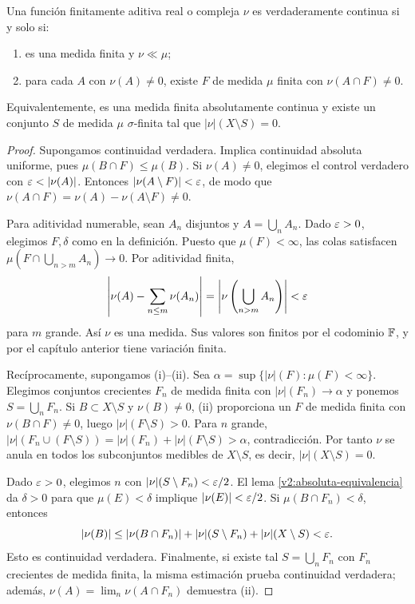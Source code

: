 \begin{proposicion}\label{v2:verdadera-caracterizacion}
Una función finitamente aditiva real o compleja $\nu$ es verdaderamente continua si y solo si:
\begin{enumerate}
\item es una medida finita y $\nu\ll\mu$;
\item para cada $A$ con $\nu(A)\ne0$, existe $F$ de medida $\mu$ finita con $\nu(A\cap F)\ne0$.
\end{enumerate}
Equivalentemente, es una medida finita absolutamente continua y existe un conjunto $S$ de medida $\mu$ $\sigma$-finita tal que $|\nu|(X\setminus S)=0$.
\end{proposicion}
\begin{proof}
Supongamos continuidad verdadera. Implica continuidad absoluta uniforme, pues $\mu(B\cap F)\le\mu(B)$. Si $\nu(A)\ne0$, elegimos el control verdadero con $\eps<|\nu(A)|$. Entonces $|\nu(A\setminus F)|<\varepsilon$, de modo que $\nu(A\cap F)=\nu(A)-\nu(A\setminus F)\ne0$.

Para aditividad numerable, sean $A_n$ disjuntos y $A=\bigcup_nA_n$. Dado $\varepsilon>0$, elegimos $F,\delta$ como en la definición. Puesto que $\mu(F)<\infty$, las colas satisfacen $\mu(F\cap\bigcup_{n>m}A_n)\to0$. Por aditividad finita,
\[
 \left|\nu(A)-\sum_{n\le m}\nu(A_n)\right|
 =\left|\nu\left(\bigcup_{n>m}A_n\right)\right|<\varepsilon
\]
para $m$ grande. Así $\nu$ es una medida. Sus valores son finitos por el codominio $\mathbb F$, y por el capítulo anterior tiene variación finita.

Recíprocamente, supongamos (i)--(ii). Sea $\alpha=\sup\{|\nu|(F):\mu(F)<\infty\}$. Elegimos conjuntos crecientes $F_n$ de medida finita con $|\nu|(F_n)\to\alpha$ y ponemos $S=\bigcup_nF_n$. Si $B\subset X\setminus S$ y $\nu(B)\ne0$, (ii) proporciona un $F$ de medida finita con $\nu(B\cap F)\ne0$, luego $|\nu|(F\setminus S)>0$. Para $n$ grande,
$|\nu|(F_n\cup(F\setminus S))=|\nu|(F_n)+|\nu|(F\setminus S)>\alpha$, contradicción. Por tanto $\nu$ se anula en todos los subconjuntos medibles de $X\setminus S$, es decir, $|\nu|(X\setminus S)=0$.

Dado $\varepsilon>0$, elegimos $n$ con $|\nu|(S\setminus F_n)<\varepsilon/2$. El lema \ref{v2:absoluta-equivalencia} da $\delta>0$ para que $\mu(E)<\delta$ implique $|\nu(E)|<\varepsilon/2$. Si $\mu(B\cap F_n)<\delta$, entonces
\[
 |\nu(B)|\le|\nu(B\cap F_n)|+|\nu|(S\setminus F_n)+|\nu|(X\setminus S)<\varepsilon.
\]
Esto es continuidad verdadera. Finalmente, si existe tal $S=\bigcup_nF_n$ con $F_n$ crecientes de medida finita, la misma estimación prueba continuidad verdadera; además, $\nu(A)=\lim_n\nu(A\cap F_n)$ demuestra (ii).
\end{proof}
